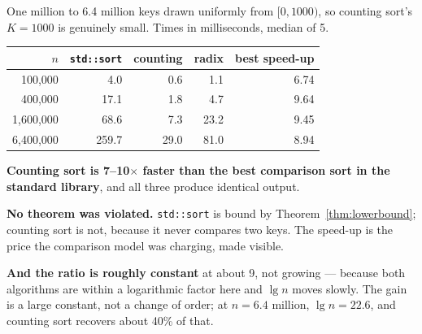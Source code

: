 \begin{worked}
One million to 6.4 million keys drawn uniformly from $[0, 1000)$, so counting
sort's $K = 1000$ is genuinely small. Times in milliseconds, median of 5.

\begin{center}
\begin{tabular}{@{}rrrrr@{}}
\toprule
\rowcolor{primary!15}
$n$ & \texttt{std::sort} & counting & radix & best speed-up \\
\midrule
  100{,}000 &   4.0 &  0.6 &  1.1 & 6.74 \\
  400{,}000 &  17.1 &  1.8 &  4.7 & 9.64 \\
1{,}600{,}000 &  68.6 &  7.3 & 23.2 & 9.45 \\
6{,}400{,}000 & 259.7 & 29.0 & 81.0 & 8.94 \\
\bottomrule
\end{tabular}
\end{center}

\smallskip
\textbf{Counting sort is 7--10$\times$ faster than the best comparison sort in
the standard library}, and all three produce identical output.

\smallskip
\textbf{No theorem was violated.} \texttt{std::sort} is bound by
Theorem~\ref{thm:lowerbound}; counting sort is not, because it never compares
two keys. The speed-up is the price the comparison model was charging, made
visible.

\smallskip
\textbf{And the ratio is roughly constant} at about 9, not growing --- because
both algorithms are within a logarithmic factor here and $\lg n$ moves slowly.
The gain is a large constant, not a change of order; at $n = 6.4$ million,
$\lg n = 22.6$, and counting sort recovers about 40\% of that.
\end{worked}

